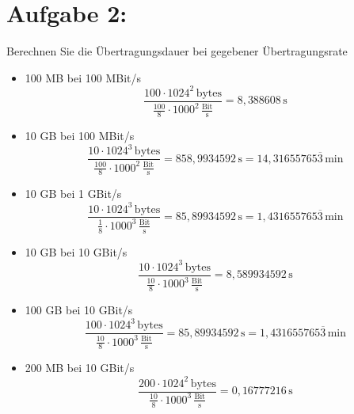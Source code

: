 \section{Aufgabe 2:}
Berechnen Sie die Übertragungsdauer bei gegebener Übertragungsrate
\begin{itemize}
\item 100 MB bei 100 MBit/s \\
\begin{equation*}
 \frac{100 \cdot 1024^2 \, \textrm{bytes}}{\frac{100}{8} \cdot 1000^2 \, \frac{\textrm{Bit}}{\textrm{s}}} = 8,388608 \, \textrm{s} 
\end{equation*}

\item 10 GB bei 100 MBit/s \\
\begin{equation*}
 \frac{10 \cdot 1024^3 \, \textrm{bytes}}{\frac{100}{8} \cdot 1000^2 \, \frac{\textrm{Bit}}{\textrm{s}}} = 858,9934592 \, \textrm{s} = 14,31655765\overline{3} \, \textrm{min}
\end{equation*}

\item 10 GB bei 1 GBit/s \\
\begin{equation*}
 \frac{10 \cdot 1024^3 \, \textrm{bytes}}{\frac{1}{8} \cdot 1000^3 \, \frac{\textrm{Bit}}{\textrm{s}}} = 85,89934592 \, \textrm{s} = 1,431655765\overline{3} \, \textrm{min}
\end{equation*}

\item 10 GB bei 10 GBit/s \\
\begin{equation*}
 \frac{10 \cdot 1024^3 \, \textrm{bytes}}{\frac{10}{8} \cdot 1000^3 \, \frac{\textrm{Bit}}{\textrm{s}}} = 8,589934592 \, \textrm{s}
\end{equation*}

\item 100 GB bei 10 GBit/s \\
\begin{equation*}
 \frac{100 \cdot 1024^3 \, \textrm{bytes}}{\frac{10}{8} \cdot 1000^3 \, \frac{\textrm{Bit}}{\textrm{s}}} = 85,89934592 \, \textrm{s} = 1,431655765\overline{3} \, \textrm{min}
\end{equation*}

\item 200 MB bei 10 GBit/s \\
\begin{equation*}
 \frac{200 \cdot 1024^2 \, \textrm{bytes}}{\frac{10}{8} \cdot 1000^3 \, \frac{\textrm{Bit}}{\textrm{s}}} = 0,16777216 \, \textrm{s}
\end{equation*}


\end{itemize}
